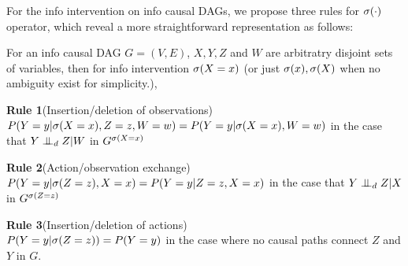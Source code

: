 For the info intervention on info causal DAGs, we propose three rules for $\mathrm{\sigma}(\cdot)$ operator, which reveal a more straightforward representation as follows: 

\begin{Thm}
	\label{thm:rules}
	For an info causal DAG $G=(V, E)$, $X, Y, Z$ and $W$ are arbitratry disjoint sets of variables, then for info intervention $\mathrm{\sigma}(X=x)$ (or just $\mathrm{\sigma}(x), \mathrm{\sigma}(X)$ when no ambiguity exist for simplicity.), 
	
	\textbf{Rule 1}(Insertion/deletion of observations) \\
	$P(Y=y|\mathrm{\sigma}(X=x), Z=z, W=w) = P(Y=y|\mathrm{\sigma}(X=x), W=w)$ in the case that $Y \perp\mkern-9.5mu\perp_d Z|W$ in $G^{\mathrm{\sigma}(X=x)}$
	
	\textbf{Rule 2}(Action/observation exchange) \\
	$P(Y=y|\mathrm{\sigma}(Z=z), X=x) = P(Y=y|Z=z, X=x)$  in the case that $Y\perp\mkern-9.5mu\perp_d Z|X$ in $G^{\mathrm{\sigma}(Z=z)}$   
	
	\textbf{Rule 3}(Insertion/deletion of actions) \\
	$P(Y=y|\mathrm{\sigma}(Z=z)) = P(Y=y)$ in the case where no causal paths connect $Z$ and $Y$ in $G$.  
\end{Thm}

